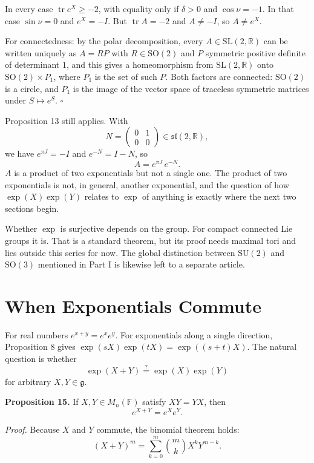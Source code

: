 \documentclass[11pt]{article}
\begin{document}
In every case $\operatorname{tr} e^X \ge -2$, with equality only if $\delta > 0$ and $\cos \nu = -1$. In that case $\sin \nu = 0$ and $e^X = -I$. But $\operatorname{tr} A = -2$ and $A \ne -I$, so $A \ne e^X$.

For connectedness: by the polar decomposition, every $A \in \mathrm{SL}(2, \mathbb{R})$ can be written uniquely as $A = RP$ with $R \in \mathrm{SO}(2)$ and $P$ symmetric positive definite of determinant $1$, and this gives a homeomorphism from $\mathrm{SL}(2, \mathbb{R})$ onto $\mathrm{SO}(2) \times P_1$, where $P_1$ is the set of such $P$. Both factors are connected: $\mathrm{SO}(2)$ is a circle, and $P_1$ is the image of the vector space of traceless symmetric matrices under $S \mapsto e^S$. $\square$

Proposition 13 still applies. With
\[
N = \begin{pmatrix} 0 & 1 \\ 0 & 0 \end{pmatrix} \in \mathfrak{sl}(2, \mathbb{R}),
\]
we have $e^{\pi J} = -I$ and $e^{-N} = I - N$, so
\[
A = e^{\pi J}\, e^{-N}.
\]
$A$ is a product of two exponentials but not a single one. The product of two exponentials is not, in general, another exponential, and the question of how $\exp(X)\exp(Y)$ relates to $\exp$ of anything is exactly where the next two sections begin.

Whether $\exp$ is surjective depends on the group. For compact connected Lie groups it is. That is a standard theorem, but its proof needs maximal tori and lies outside this series for now. The global distinction between $\mathrm{SU}(2)$ and $\mathrm{SO}(3)$ mentioned in Part I is likewise left to a separate article.

\section{When Exponentials Commute}

For real numbers $e^{x+y} = e^x e^y$. For exponentials along a single direction, Proposition 8 gives $\exp(sX)\exp(tX) = \exp((s + t)X)$. The natural question is whether
\[
\exp(X + Y) \stackrel{?}{=} \exp(X) \exp(Y)
\]
for arbitrary $X, Y \in \mathfrak{g}$.

\textbf{Proposition 15.} If $X, Y \in M_n(\mathbb{F})$ satisfy $XY = YX$, then
\[
e^{X + Y} = e^X e^Y.
\]

\emph{Proof.} Because $X$ and $Y$ commute, the binomial theorem holds:
\[
(X + Y)^m = \sum_{k=0}^{m} \binom{m}{k} X^k Y^{m-k}.
\]
\end{document}
